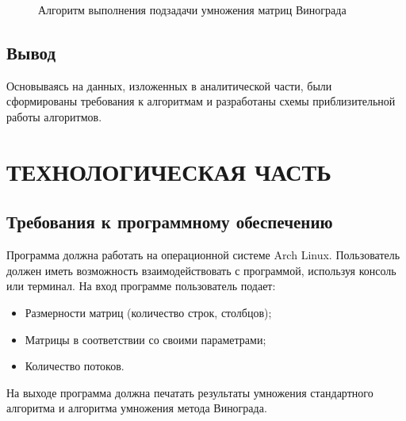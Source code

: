 \documentclass[a4paper,12pt]{article}
\begin{document}
\begin{figure}[p]
\caption{Алгоритм выполнения подзадачи умножения матриц Винограда}
\label{schemes:scheme4}
\end{figure}

\newpage
\subsection{Вывод}
Основываясь на данных, изложенных в аналитической части, были сформированы требования к алгоритмам и разработаны схемы приблизительной работы алгоритмов.

\newpage
\section{ТЕХНОЛОГИЧЕСКАЯ ЧАСТЬ}
\subsection{Требования к программному обеспечению}
Программа должна работать на операционной системе Arch Linux. Пользователь должен иметь возможность взаимодействовать с программой, используя консоль или терминал. На вход программе пользователь подает:
\begin{itemize}
\item Размерности матриц (количество строк, столбцов);
\item Матрицы в соответствии со своими параметрами;
\item Количество потоков.
\end{itemize}
На выходе программа должна печатать результаты умножения стандартного алгоритма и алгоритма умножения метода Винограда.
\end{document}

